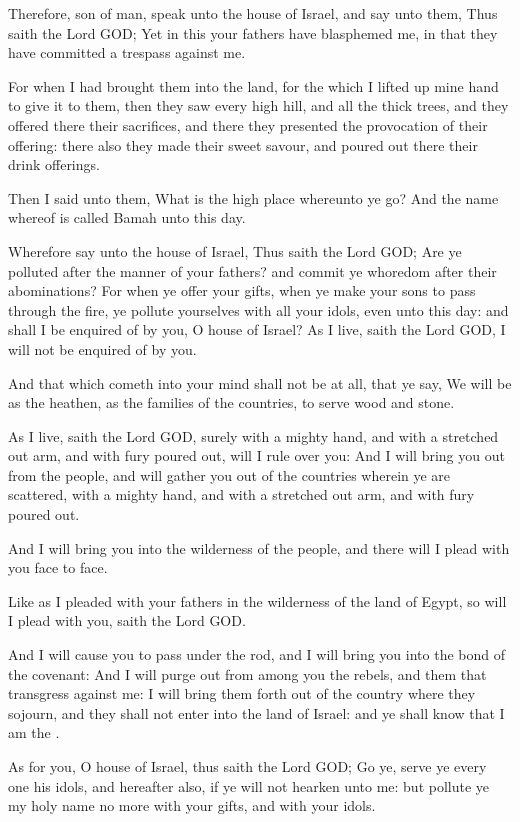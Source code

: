 \verse Therefore, son of man, speak unto the house of Israel, and say unto them, Thus saith the Lord GOD; Yet in this your fathers have blasphemed me, in that they have committed a trespass against me.

\verse For when I had brought them into the land, for the which I lifted up mine hand to give it to them, then they saw every high hill, and all the thick trees, and they offered there their sacrifices, and there they presented the provocation of their offering: there also they made their sweet savour, and poured out there their drink offerings.

\verse Then I said unto them, What is the high place whereunto ye go?  And the name whereof is called Bamah unto this day.

\verse Wherefore say unto the house of Israel, Thus saith the Lord GOD; Are ye polluted after the manner of your fathers? and commit ye whoredom after their abominations?  \verse For when ye offer your gifts, when ye make your sons to pass through the fire, ye pollute yourselves with all your idols, even unto this day: and shall I be enquired of by you, O house of Israel? As I live, saith the Lord GOD, I will not be enquired of by you.

\verse And that which cometh into your mind shall not be at all, that ye say, We will be as the heathen, as the families of the countries, to serve wood and stone.

\verse As I live, saith the Lord GOD, surely with a mighty hand, and with a stretched out arm, and with fury poured out, will I rule over you: \verse And I will bring you out from the people, and will gather you out of the countries wherein ye are scattered, with a mighty hand, and with a stretched out arm, and with fury poured out.

\verse And I will bring you into the wilderness of the people, and there will I plead with you face to face.

\verse Like as I pleaded with your fathers in the wilderness of the land of Egypt, so will I plead with you, saith the Lord GOD.

\verse And I will cause you to pass under the rod, and I will bring you into the bond of the covenant: \verse And I will purge out from among you the rebels, and them that transgress against me: I will bring them forth out of the country where they sojourn, and they shall not enter into the land of Israel: and ye shall know that I am the \LORD.

\verse As for you, O house of Israel, thus saith the Lord GOD; Go ye, serve ye every one his idols, and hereafter also, if ye will not hearken unto me: but pollute ye my holy name no more with your gifts, and with your idols.

